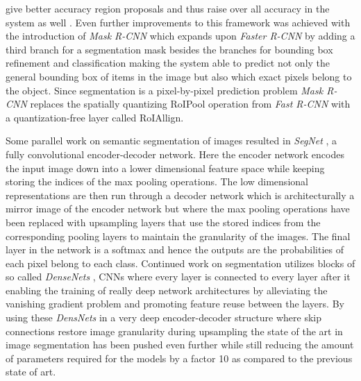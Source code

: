 \documentclass{kththesis}
\newcommand{\bibentry}[1]{\parencite{#1}}
\begin{document}
give better accuracy region proposals and thus raise over all accuracy in the
system as well \bibentry{ren2015faster}. Even further improvements to this
framework was achieved with the introduction of \emph{Mask R-CNN}
\bibentry{he2017mask} which expands upon \emph{Faster R-CNN} by adding a third
branch for a segmentation mask besides the branches for bounding box refinement
and classification making the system able to predict not only the general
bounding box of items in the image but also which exact pixels belong to the
object. Since segmentation is a pixel-by-pixel prediction problem \emph{Mask
  R-CNN} replaces the spatially quantizing RoIPool operation from \emph{Fast
  R-CNN} with a quantization-free layer called RoIAllign. 

Some parallel work on semantic segmentation of images resulted in \emph{SegNet}
\bibentry{badrinarayanan2015segnet}, a fully convolutional encoder-decoder
network. Here the encoder network encodes the input image down into a lower
dimensional feature space while keeping storing the indices of the max pooling
operations. The low dimensional representations are then run through a decoder
network which is architecturally a mirror image of the encoder network but where
the max pooling operations have been replaced with upsampling layers that use
the stored indices from the corresponding pooling layers to maintain the
granularity of the images. The final layer in the network is a softmax and hence
the outputs are the probabilities of each pixel belong to each class.
Continued work on segmentation utilizes blocks of so called \emph{DenseNets}
\bibentry{huang2017densely}, CNNs where every layer is connected to every layer
after it enabling the training of really deep network architectures by
alleviating the vanishing gradient problem and promoting feature reuse between
the layers. By using these \emph{DensNets} in a very deep encoder-decoder
structure where skip connections restore image granularity during upsampling the
state of the art in image segmentation has been pushed even further
\bibentry{jegou2017one} while still reducing the amount of parameters required
for the models by a factor 10 as compared to the previous state of art. 
\end{document}
